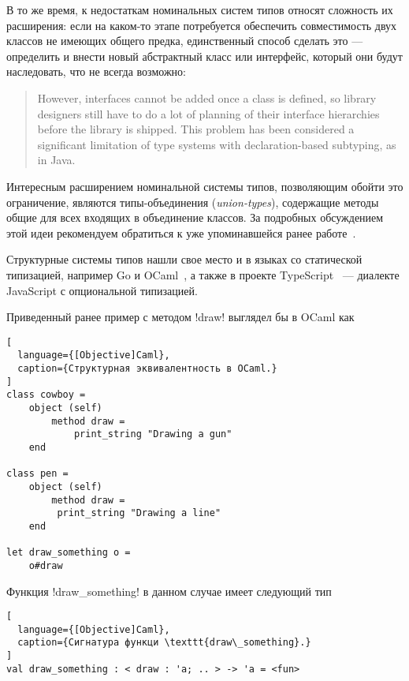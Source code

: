 В то же время, к недостаткам номинальных систем типов относят сложность их
расширения: если на каком-то этапе потребуется обеспечить совместимость двух
классов не имеющих общего предка, единственный способ сделать это --- определить
и внести новый абстрактный класс или интерфейс, который они будут наследовать,
что не всегда возможно:

\begin{quote}
However, interfaces cannot be added once a class is defined, so library
designers still have to do a lot of planning of their interface hierarchies
before the library is shipped. This problem has been considered a significant
limitation of type systems with declaration-based subtyping, as in Java.
\end{quote}

Интересным расширением номинальной системы типов, позволяющим обойти это
ограничение, являются типы-объединения (\emph{union-types}), содержащие методы
общие для всех входящих в объединение классов. За подробных обсуждением этой
идеи рекомендуем обратиться к уже упоминавшейся ранее
работе~\cite[]{Igarashi2006}.

Структурные системы типов нашли свое место и в языках со статической
типизацией, например Go и OCaml~\cite[с.~33]{Ocaml}, а также в проекте
TypeScript~\cite[]{TypeScript} --- диалекте JavaScript с опциональной
типизацией. 

Приведенный ранее пример с методом !draw! выглядел бы в OCaml как

\begin{lstlisting}[
  language={[Objective]Caml},
  caption={Структурная эквивалентность в OCaml.}
]
class cowboy =
    object (self)
        method draw =
            print_string "Drawing a gun"
    end

class pen = 
    object (self) 
        method draw =
         print_string "Drawing a line"
    end

let draw_something o =
    o#draw

\end{lstlisting}

Функция !draw_something! в данном случае имеет следующий тип

\begin{lstlisting}[
  language={[Objective]Caml},
  caption={Сигнатура функци \texttt{draw\_something}.}
]
val draw_something : < draw : 'a; .. > -> 'a = <fun>
\end{lstlisting}

